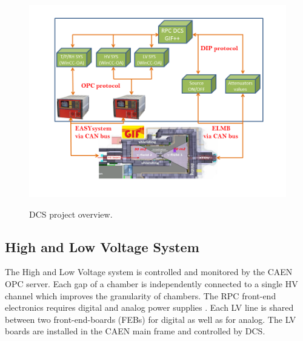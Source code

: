 \documentclass[a4paper,11pt]{article}
\begin{document}
\begin{figure}[htp]
\centering
\hspace{-0.5cm}
\includegraphics[scale=0.5,trim=60 30 60 30,clip]{images/DCS_sys.png}\\
 \caption{DCS project overview.}
\label{DCS_sys}
\end{figure}

 
\subsection{High and Low Voltage System}
The High and Low Voltage system is controlled and monitored by the CAEN OPC server. Each gap of a chamber is independently connected to a single HV channel which improves the granularity of chambers. The RPC front-end electronics requires digital and analog power supplies \cite{feb}. Each LV line is shared between two front-end-boards (FEBs) for digital as well as for analog. The LV boards are installed in the CAEN main frame and controlled by DCS. 
 
\end{document}
